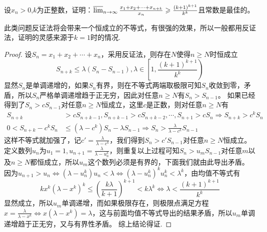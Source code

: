 \documentclass[../../main.tex]{subfiles}%
\begin{document}
\begin{example}
设\(x_n>0\),\(k\)为正整数，证明：\(\varlimsup_{n\rightarrow\infty}\frac{x_1 + x_2+\cdots + x_{n + k}}{x_n}\geqslant \frac{(k + 1)^{k + 1}}{k^k}\)且常数是最佳的。
\end{example}
\begin{note}
此类问题反证法将会带来一个恒成立的不等式，有很强的效果，所以一般都用反证法，证明的灵感来源于\(k = 1\)时的情况.
\end{note}
\begin{proof}
设\(S_n=x_1 + x_2+\cdots + x_n\)，采用反证法，则存在\(N\)使得\(n\geqslant  N\)时恒成立
\[S_{n + k}\leqslant \lambda(S_n - S_{n - 1}),\lambda\in\left[1,\frac{(k + 1)^{k + 1}}{k^k}\right)\]
显然\(S_n\)是单调递增的，如果\(S_n\)有界，则在不等式两端取极限可知\(S_n\)收敛到零，矛盾，所以\(S_n\)严格单调递增趋于正无穷，因此对任意\(n\geqslant  N\)有\(S_n>S_{n - 1}\)。
如果已经得到了\(S_n>cS_{n - 1}\)对任意\(n\geqslant  N\)恒成立，这里\(c\)是正数，则对任意\(n\geqslant  N\)有
\begin{align*}
S_{n + k}&>cS_{n + k - 1},S_{n + k - 1}>cS_{n + k - 2},\cdots,S_{n + 1}>cS_n\Rightarrow S_{n + k}>c^kS_n\\
0<S_{n + k}-c^kS_n&\leqslant (\lambda - c^k)S_n-\lambda S_{n - 1}\Rightarrow S_n>\frac{\lambda}{\lambda - c^k}S_{n - 1}
\end{align*}
这样不等式就加强了，记\(c'=\frac{\lambda}{\lambda - c^k}\)，我们得到\(S_n>c'S_{n - 1}\)对任意\(n\geqslant  N\)恒成立。
定义数列\(u_n\)为\(u_1 = 1,u_{n + 1}=\frac{\lambda}{\lambda - u_n^k}\)，则重复以上过程可知\(S_n>u_mS_{n - 1}\)对任意\(m\)以及\(n\geqslant  N\)都恒成立，所以\(u_m\)这个数列必须是有界的，下面我们就由此导出矛盾。
因为\(u_{n + 1}>u_n\Leftrightarrow(\lambda - u_n^k)u_n<\lambda\Leftrightarrow(\lambda - u_n^k)^ku_n^k<\lambda^k\)，由均值不等式有
\[kx^k(\lambda - x^k)^k\leqslant \left(\frac{k\lambda}{k + 1}\right)^{k + 1}<k\lambda^k\Leftrightarrow\lambda<\frac{(k + 1)^{k + 1}}{k^k}\]
显然成立，所以\(u_m\)单调递增，而如果极限存在，则极限点满足方程\(x=\frac{\lambda}{\lambda - x^k}\Leftrightarrow x(\lambda - x^k)=\lambda\)，这与前面均值不等式导出的结果矛盾，所以\(u_m\)单调递增趋于正无穷，又与有界性矛盾。
综上结论得证.
\end{proof}
\end{document}
